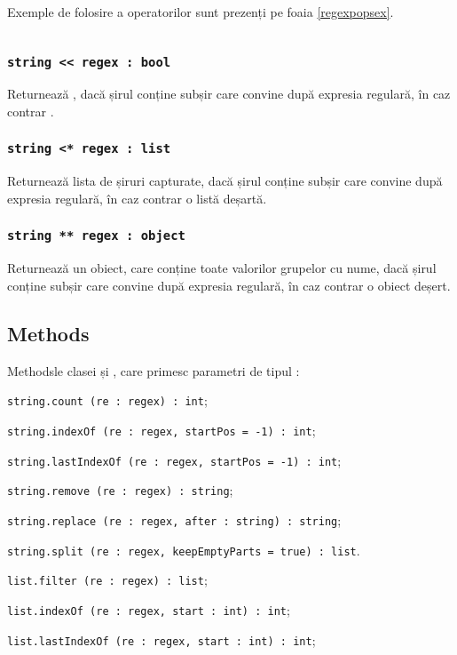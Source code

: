 Exemple de folosire a operatorilor sunt prezenți pe foaia \ref{regexpopsex}.

\begin{sourcecode}
    \label{regexpopsex}
    \inputminted[linenos]{icl}{../sources/regexpopsex.icL}
\end{sourcecode}

\subsubsection{\texttt{string << regex : bool}}

Returnează \true{}, dacă șirul conține subșir care convine după expresia regulară, în caz contrar \false{}.

\subsubsection{\texttt{string <* regex : list}}

Returnează lista de șiruri capturate, dacă șirul conține subșir care convine după expresia regulară, în caz contrar o listă deșartă.

\subsubsection{\texttt{string ** regex : object}}

Returnează un obiect, care conține toate valorilor grupelor cu nume, dacă șirul conține subșir care convine după expresia regulară, în caz contrar o obiect deșert.


\subsection{Methods}

Methodsle clasei \str{} și \listtype, care primesc parametri de tipul \regex{}:
\begin{icItems}
\item
\texttt{string.count (re : regex) : int};
\item
\texttt{string.indexOf (re : regex, startPos = -1) : int};
\item
\texttt{string.lastIndexOf (re : regex, startPos = -1) : int};
\item
\texttt{string.remove (re : regex) : string};
\item 
\texttt{string.replace (re : regex, after : string) : string};
\item
\texttt{string.split (re : regex, keepEmptyParts = true) : list}.
\item
\texttt{list.filter (re : regex) : list};
\item
\texttt{list.indexOf (re : regex, start : int) : int};
\item
\texttt{list.lastIndexOf (re : regex, start : int) : int};
\end{icItems}

